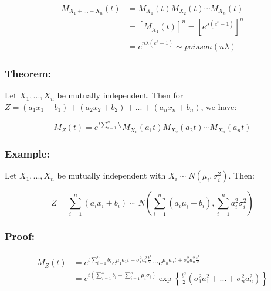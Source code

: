 \documentclass{article}
\begin{document}
\begin{equation*}
    \begin{split}
        M_{X_1+...+X_n}(t) &= M_{X_1}(t) M_{X_2}(t) \cdots M_{X_n}(t)\\
            &= \left[M_{X_1}(t) \right]^n = \left[e^{\lambda(e^t-1)}\right]^n\\
            &= e^{n\lambda(e^t-1)} \sim poisson(n\lambda)
    \end{split}
\end{equation*}


\subsubsection*{Theorem:}

Let $X_1,...,X_n$ be mutually independent. Then for $Z = (a_1 x_1 + b_1) + (a_2 x_2 + b_2) + ... + (a_n x_n + b_n)$, we have:

\begin{equation*}
    M_Z(t) = e^{t\sum_{i=1}^n b_i} M_{X_1}(a_1 t) M_{X_2}(a_2 t) \cdots M_{X_n}(a_n t)
\end{equation*}

\subsubsection*{Example:}

Let $X_1, ..., X_n$ be mutually independent with $X_i \sim N(\mu_i, \sigma_i^2)$. Then:

\begin{equation*}
    Z = \sum_{i=1}^n (a_i x_i + b_i) \sim N\left(\sum_{i=1}^n (a_i \mu_i + b_i), \sum_{i=1}^n a_i^2 \sigma_i^2 \right)
\end{equation*}

\subsubsection*{Proof:}

\begin{equation*}
    \begin{split}
        M_Z(t) &= e^{t\sum_{i=1}^n b_i} e^{\mu_1 a_1 t + \sigma_1^2 a_1^2 \frac{t^2}{2}} \cdots e^{\mu_n a_n t + \sigma_n^2 a_n^2 \frac{t^2}{2}}\\
        &= e^{t\left(\sum_{i=1}^n b_i + \sum_{i=1}^n \mu_i \sigma_i \right)} \exp \left\{ \frac{t^2}{2} (\sigma_1^2 a_1^2 + ... + \sigma_n^2 a_n^2)\right\}
    \end{split}
\end{equation*}
\end{document}
